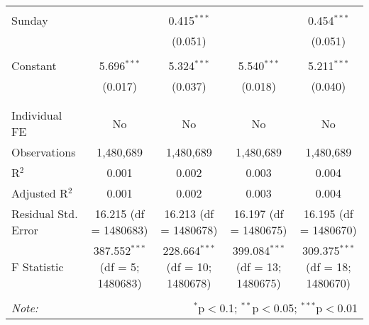\documentclass[
]{article}
\begin{document}
\begin{table}[!htbp]
{\begin{tabular}{@{\extracolsep{5pt}}lcccc}
  & & & & \\ 
 Sunday &  & 0.415$^{***}$ &  & 0.454$^{***}$ \\ 
  &  & (0.051) &  & (0.051) \\ 
  & & & & \\ 
 Constant & 5.696$^{***}$ & 5.324$^{***}$ & 5.540$^{***}$ & 5.211$^{***}$ \\ 
  & (0.017) & (0.037) & (0.018) & (0.040) \\ 
  & & & & \\ 
\hline \\[-1.8ex] 
Individual FE & No & No & No & No \\ 
Observations & 1,480,689 & 1,480,689 & 1,480,689 & 1,480,689 \\ 
R$^{2}$ & 0.001 & 0.002 & 0.003 & 0.004 \\ 
Adjusted R$^{2}$ & 0.001 & 0.002 & 0.003 & 0.004 \\ 
Residual Std. Error & 16.215 (df = 1480683) & 16.213 (df = 1480678) & 16.197 (df = 1480675) & 16.195 (df = 1480670) \\ 
F Statistic & 387.552$^{***}$ (df = 5; 1480683) & 228.664$^{***}$ (df = 10; 1480678) & 399.084$^{***}$ (df = 13; 1480675) & 309.375$^{***}$ (df = 18; 1480670) \\ 
\hline 
\hline \\[-1.8ex] 
\textit{Note:}  & \multicolumn{4}{r}{$^{*}$p$<$0.1; $^{**}$p$<$0.05; $^{***}$p$<$0.01} \\ 
\end{tabular}
} 
\end{table} 
\newpage
\end{document}
